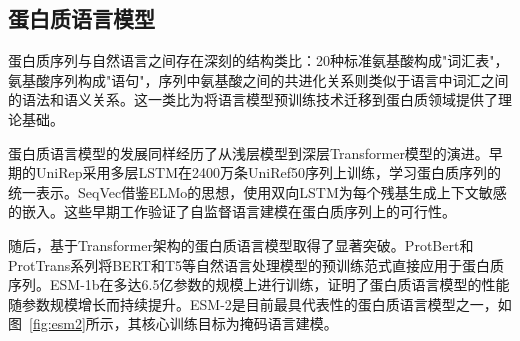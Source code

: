 \subsection{蛋白质语言模型}

蛋白质序列与自然语言之间存在深刻的结构类比：20种标准氨基酸构成"词汇表"，氨基酸序列构成"语句"，序列中氨基酸之间的共进化关系则类似于语言中词汇之间的语法和语义关系。这一类比为将语言模型预训练技术迁移到蛋白质领域提供了理论基础。

蛋白质语言模型的发展同样经历了从浅层模型到深层Transformer模型的演进。早期的UniRep\cite{alley2019unified}采用多层LSTM在2400万条UniRef50序列上训练，学习蛋白质序列的统一表示。SeqVec\cite{heinzinger2019modeling}借鉴ELMo的思想，使用双向LSTM为每个残基生成上下文敏感的嵌入。这些早期工作验证了自监督语言建模在蛋白质序列上的可行性。

随后，基于Transformer架构的蛋白质语言模型取得了显著突破。ProtBert\cite{elnaggar2022prottrans}和ProtTrans系列\cite{elnaggar2022prottrans}将BERT和T5等自然语言处理模型的预训练范式直接应用于蛋白质序列。ESM-1b\cite{rives2021biological}在多达6.5亿参数的规模上进行训练，证明了蛋白质语言模型的性能随参数规模增长而持续提升。ESM-2\cite{lin2023evolutionary}是目前最具代表性的蛋白质语言模型之一，如图~\ref{fig:esm2}所示，其核心训练目标为掩码语言建模。

